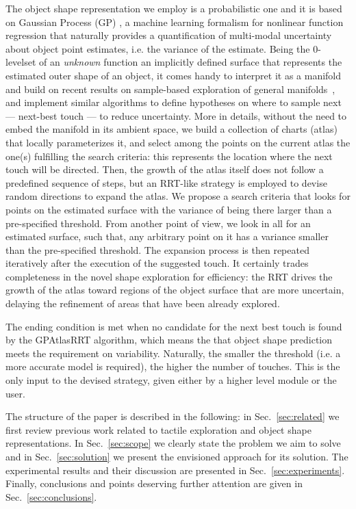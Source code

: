 The object shape representation we employ is a probabilistic one and it is based on Gaussian Process (GP) \citep{Rasmussen2006Gaussian}, a machine learning formalism for nonlinear function regression that naturally provides a quantification of multi-modal uncertainty about object point estimates, i.e. the variance of the estimate. Being the $0$-levelset of an \emph{unknown} function an implicitly defined surface that represents the estimated outer shape of an object, it comes handy to interpret it as a manifold and build on recent results on sample-based exploration of general manifolds~\citep{Jaillet2013Path}, and implement similar algorithms to define hypotheses on where to sample next --- next-best touch --- to reduce uncertainty. More in details, without the need to embed the manifold in its ambient space, we build a collection of charts (atlas) that locally parameterizes it, and select among the points on the current atlas the one(s) fulfilling the search criteria: this represents the location where the next touch will be directed. Then, the growth of the atlas itself does not follow a predefined sequence of steps, but an RRT-like strategy is employed to devise random directions to expand the atlas.
We propose a search criteria that looks for points on the estimated surface with the variance of being there larger than a pre-specified threshold. From another point of view, we look in all for an estimated surface, such that, any arbitrary point on it has a variance smaller than the pre-specified threshold. The expansion process is then repeated iteratively after the execution of the suggested touch.
It certainly trades completeness in the novel shape exploration for efficiency: the RRT drives the growth of the atlas toward  regions of the object surface that are more uncertain, delaying the refinement of areas that have been already explored.

The ending condition is met when no candidate for the next best touch is found by the GPAtlasRRT algorithm, which means the that object shape prediction meets the requirement on variability.
Naturally, the smaller the threshold (i.e. a more accurate model is required), the higher the number of touches. This is the only input to the devised strategy, given either by a higher level module or the user.

The structure of the paper is described in the following: in Sec.~\ref{sec:related} we first review previous work related to tactile exploration and object shape representations. In Sec.~\ref{sec:scope} we clearly state the problem we aim to solve and in Sec.~\ref{sec:solution} we present the envisioned approach for its solution. The experimental results and their discussion are presented in Sec.~\ref{sec:experiments}. Finally, conclusions and points deserving further attention are given in Sec.~\ref{sec:conclusions}.

